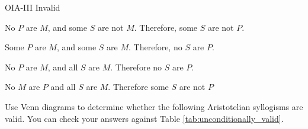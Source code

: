 \begin{exercises}
{ OIA-III Invalid 
} 
 
\item No $P$ are $M$, and some $S$ are not $M$. Therefore, some $S$ are not $P$.
 
\item Some $P$ are $M$, and some $S$ are $M$. Therefore, no $S$ are $P$.

\item No $P$ are $M$, and all $S$ are $M$. Therefore no $S$ are $P$.
\item No $M$ are $P$ and all $S$ are $M$. Therefore some $S$ are not $P$
\end{exercises}

\noindent \problempart Use Venn diagrams to determine whether the following Aristotelian syllogisms are valid. You can check your answers against Table \ref{tab:unconditionally_valid}.

